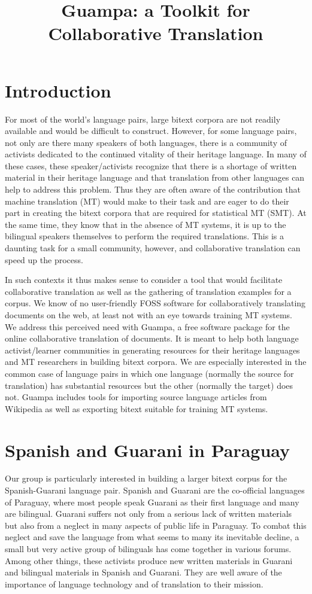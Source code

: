 \documentclass[10pt, a4paper]{article}
\title{Guampa: a Toolkit for Collaborative Translation}
\begin{document}
\maketitleabstract

\section{Introduction}
For most of the world's language pairs, large bitext corpora are not readily
available and would be difficult to construct. However, for some language
pairs, not only are there many speakers of both languages, there is a community
of activists dedicated to the continued vitality of their heritage language. In
many of these cases, these speaker/activists recognize that there is a shortage
of written material in their heritage language and that translation from other
languages can help to address this problem. Thus they are often aware of the
contribution that machine translation (MT) would make to their task and are eager to do their part in
creating the bitext corpora that are required for statistical MT (SMT). At the same time, they
know that in the absence of MT systems, it is up to the bilingual speakers
themselves to perform the required translations. This is a daunting task for a
small community, however, and collaborative translation can speed up the
process.

In such contexts it thus makes sense to consider a tool that would facilitate
collaborative translation as well as the gathering of translation examples for
a corpus. We know of no user-friendly FOSS software for collaboratively
translating documents on the web, at least not with an eye towards training MT
systems. We address this perceived need with Guampa, a free software package
for the online collaborative translation of documents. It is meant to help both
language activist/learner communities in generating resources for their
heritage languages and MT researchers in building bitext corpora. We are
especially interested in the common case of language pairs in which one
language (normally the source for translation) has substantial resources but
the other (normally the target) does not. Guampa includes tools for importing
source language articles from Wikipedia as well as exporting bitext suitable
for training MT systems.

\section{Spanish and Guarani in Paraguay}
Our group is particularly interested in building a larger bitext corpus for the
Spanish-Guarani language pair. Spanish and Guarani are the co-official
languages of Paraguay, where most people speak Guarani as their first language
and many are bilingual. Guarani suffers not only from a serious lack of
written materials but also from a neglect in many aspects of public life in
Paraguay. To combat this neglect and save the language from what seems to many
its inevitable decline, a small but very active group of bilinguals has come
together in various forums. Among other things, these activists produce new
written materials in Guarani and bilingual materials in Spanish and Guarani.
They are well aware of the importance of language technology and of translation
to their mission.
\end{document}
